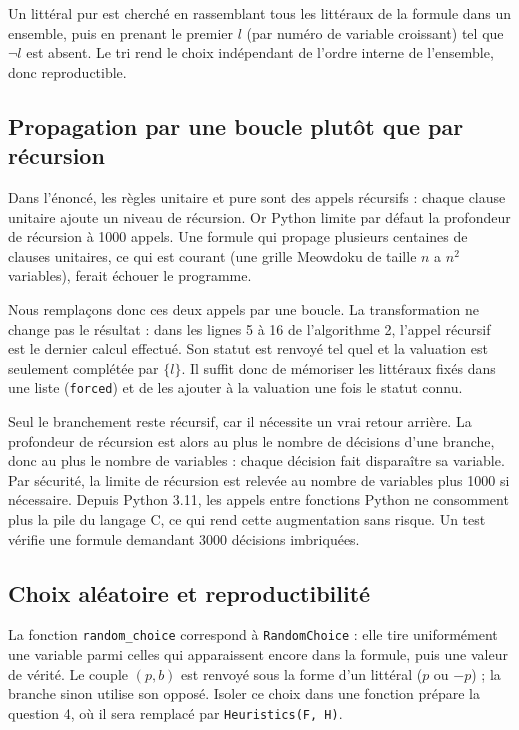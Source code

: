\documentclass[11pt,a4paper]{article}
\begin{document}
Un littéral pur est cherché en rassemblant tous les littéraux de la formule
dans un ensemble, puis en prenant le premier $l$ (par numéro de variable
croissant) tel que $\neg l$ est absent. Le tri rend le choix indépendant de
l'ordre interne de l'ensemble, donc reproductible.

\subsection{Propagation par une boucle plutôt que par récursion}

Dans l'énoncé, les règles unitaire et pure sont des appels récursifs : chaque
clause unitaire ajoute un niveau de récursion. Or Python limite par défaut la
profondeur de récursion à 1000 appels. Une formule qui propage plusieurs
centaines de clauses unitaires, ce qui est courant (une grille Meowdoku de
taille $n$ a $n^2$ variables), ferait échouer le programme.

Nous remplaçons donc ces deux appels par une boucle. La transformation ne
change pas le résultat : dans les lignes 5 à 16 de l'algorithme 2, l'appel
récursif est le dernier calcul effectué. Son statut est renvoyé tel quel et la
valuation est seulement complétée par $\{l\}$. Il suffit donc de mémoriser les
littéraux fixés dans une liste (\texttt{forced}) et de les ajouter à la
valuation une fois le statut connu.

Seul le branchement reste récursif, car il nécessite un vrai retour arrière.
La profondeur de récursion est alors au plus le nombre de décisions d'une
branche, donc au plus le nombre de variables : chaque décision fait
disparaître sa variable. Par sécurité, la limite de récursion est relevée au
nombre de variables plus 1000 si nécessaire. Depuis Python 3.11, les appels
entre fonctions Python ne consomment plus la pile du langage C, ce qui rend
cette augmentation sans risque. Un test vérifie une formule demandant 3000
décisions imbriquées.

\subsection{Choix aléatoire et reproductibilité}

La fonction \texttt{random\_choice} correspond à \texttt{RandomChoice} : elle
tire uniformément une variable parmi celles qui apparaissent encore dans la
formule, puis une valeur de vérité. Le couple $(p,b)$ est renvoyé sous la forme
d'un littéral ($p$ ou $-p$) ; la branche \og sinon \fg{} utilise son opposé.
Isoler ce choix dans une fonction prépare la question 4, où il sera remplacé
par \texttt{Heuristics(F, H)}.
\end{document}
